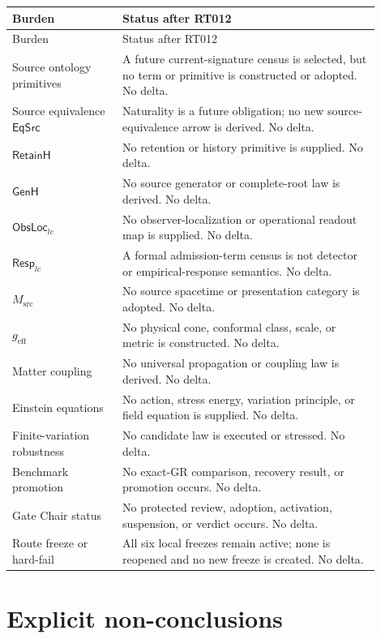\documentclass[11pt]{article}
\newcommand{\EqSrc}{\mathsf{EqSrc}}
\begin{document}
\begin{longtable}{P{0.27\linewidth}P{0.63\linewidth}}
\toprule
Burden & Status after RT012 \\
\midrule
\endfirsthead
\toprule
Burden & Status after RT012 \\
\midrule
\endhead
Source ontology primitives & A future current-signature census is selected,
but no term or primitive is constructed or adopted.  No delta.\\
Source equivalence \(\EqSrc\) & Naturality is a future obligation; no new
source-equivalence arrow is derived.  No delta.\\
\(\mathsf{RetainH}\) & No retention or history primitive is supplied.  No
delta.\\
\(\mathsf{GenH}\) & No source generator or complete-root law is derived.  No
delta.\\
\(\mathsf{ObsLoc}_{lc}\) & No observer-localization or operational readout
map is supplied.  No delta.\\
\(\mathsf{Resp}_{lc}\) & A formal admission-term census is not detector or
empirical-response semantics.  No delta.\\
\(M_{\mathrm{src}}\) & No source spacetime or presentation category is
adopted.  No delta.\\
\(g_{\mathrm{eff}}\) & No physical cone, conformal class, scale, or metric is
constructed.  No delta.\\
Matter coupling & No universal propagation or coupling law is derived.  No
delta.\\
Einstein equations & No action, stress energy, variation principle, or field
equation is supplied.  No delta.\\
Finite-variation robustness & No candidate law is executed or stressed.  No
delta.\\
Benchmark promotion & No exact-GR comparison, recovery result, or promotion
occurs.  No delta.\\
Gate Chair status & No protected review, adoption, activation, suspension, or
verdict occurs.  No delta.\\
Route freeze or hard-fail & All six local freezes remain active; none is
reopened and no new freeze is created.  No delta.\\
\bottomrule
\end{longtable}

\section{Explicit non-conclusions}
\end{document}
